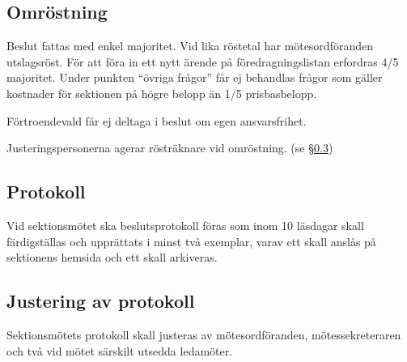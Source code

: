 \documentclass{datateknologsektionen-document}
\begin{document}
\subsection{Omröstning}
Beslut fattas med enkel majoritet. Vid lika röstetal har mötesordföranden utslagsröst.
För att föra in ett nytt ärende på föredragningslistan erfordras 4/5 majoritet. Under
punkten ``övriga frågor'' får ej behandlas frågor som gäller kostnader för sektionen på
högre belopp än 1/5 prisbasbelopp.

Förtroendevald får ej deltaga i beslut om egen ansvarsfrihet.

Justeringspersonerna agerar rösträknare vid omröstning. (se \S \ref{justeringavprotokoll})
\subsection{Protokoll}
Vid sektionsmötet ska beslutsprotokoll föras som inom 10 läsdagar skall färdigställas
och upprättats i minst två exemplar, varav ett skall anslås på sektionens hemsida och ett
skall arkiveras.
\subsection{Justering av protokoll}
\label{justeringavprotokoll}
Sektionsmötets protokoll skall justeras av mötesordföranden, mötessekreteraren och två
vid mötet särskilt utsedda ledamöter.
\end{document}
